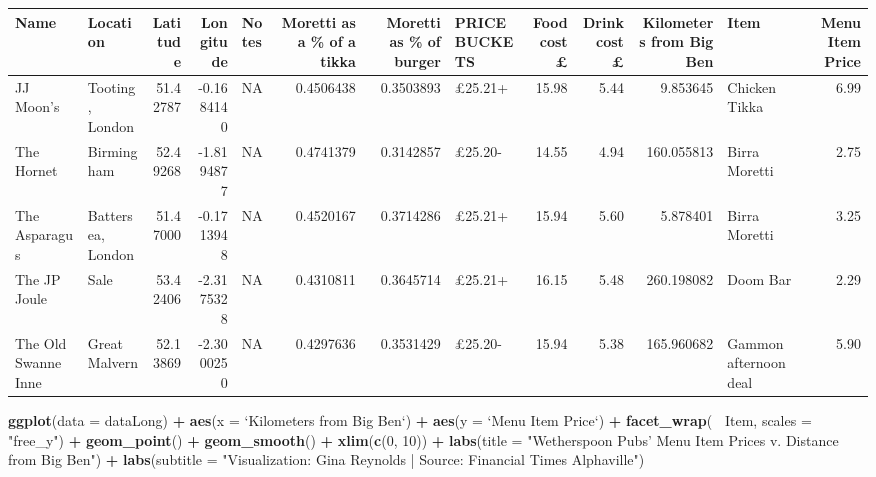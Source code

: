 \documentclass[]{book}
\newenvironment{Shaded}{\begin{snugshade}}{\end{snugshade}}
\newcommand{\KeywordTok}[1]{\textcolor[rgb]{0.13,0.29,0.53}{\textbf{#1}}}
\newcommand{\DataTypeTok}[1]{\textcolor[rgb]{0.13,0.29,0.53}{#1}}
\newcommand{\DecValTok}[1]{\textcolor[rgb]{0.00,0.00,0.81}{#1}}
\newcommand{\StringTok}[1]{\textcolor[rgb]{0.31,0.60,0.02}{#1}}
\newcommand{\OperatorTok}[1]{\textcolor[rgb]{0.81,0.36,0.00}{\textbf{#1}}}
\newcommand{\NormalTok}[1]{#1}
\theoremstyle{definition}
\theoremstyle{definition}
\theoremstyle{definition}
\theoremstyle{remark}
\begin{document}
\begin{tabular}{l|l|r|r|l|r|r|l|r|r|r|l|r}
\hline
Name & Location & Latitude & Longitude & Notes & Moretti as a \% of a tikka & Moretti as \% of burger & PRICE BUCKETS & Food cost £ & Drink cost £ & Kilometers from Big Ben & Item & Menu Item Price\\
\hline
JJ Moon's & Tooting, London & 51.42787 & -0.1684140 & NA & 0.4506438 & 0.3503893 & £25.21+ & 15.98 & 5.44 & 9.853645 & Chicken Tikka & 6.99\\
\hline
The Hornet & Birmingham & 52.49268 & -1.8194877 & NA & 0.4741379 & 0.3142857 & £25.20- & 14.55 & 4.94 & 160.055813 & Birra Moretti & 2.75\\
\hline
The Asparagus & Battersea, London & 51.47000 & -0.1713948 & NA & 0.4520167 & 0.3714286 & £25.21+ & 15.94 & 5.60 & 5.878401 & Birra Moretti & 3.25\\
\hline
The JP Joule & Sale & 53.42406 & -2.3175328 & NA & 0.4310811 & 0.3645714 & £25.21+ & 16.15 & 5.48 & 260.198082 & Doom Bar & 2.29\\
\hline
The Old Swanne Inne & Great Malvern & 52.13869 & -2.3000250 & NA & 0.4297636 & 0.3531429 & £25.20- & 15.94 & 5.38 & 165.960682 & Gammon afternoon deal & 5.90\\
\hline
\end{tabular}

\begin{Shaded}
\begin{Highlighting}[]
\KeywordTok{ggplot}\NormalTok{(}\DataTypeTok{data =}\NormalTok{ dataLong) }\OperatorTok{+}
\StringTok{  }\KeywordTok{aes}\NormalTok{(}\DataTypeTok{x =} \StringTok{`}\DataTypeTok{Kilometers from Big Ben}\StringTok{`}\NormalTok{) }\OperatorTok{+}
\StringTok{  }\KeywordTok{aes}\NormalTok{(}\DataTypeTok{y =} \StringTok{`}\DataTypeTok{Menu Item Price}\StringTok{`}\NormalTok{) }\OperatorTok{+}
\StringTok{  }\KeywordTok{facet_wrap}\NormalTok{(}\OperatorTok{~}\StringTok{ }\NormalTok{Item, }\DataTypeTok{scales =} \StringTok{"free_y"}\NormalTok{) }\OperatorTok{+}
\StringTok{  }\KeywordTok{geom_point}\NormalTok{() }\OperatorTok{+}
\StringTok{  }\KeywordTok{geom_smooth}\NormalTok{() }\OperatorTok{+}
\StringTok{  }\KeywordTok{xlim}\NormalTok{(}\KeywordTok{c}\NormalTok{(}\DecValTok{0}\NormalTok{, }\DecValTok{10}\NormalTok{)) }\OperatorTok{+}
\StringTok{  }\KeywordTok{labs}\NormalTok{(}\DataTypeTok{title =} \StringTok{"Wetherspoon Pubs' Menu Item Prices v. Distance from Big Ben"}\NormalTok{) }\OperatorTok{+}
\StringTok{  }\KeywordTok{labs}\NormalTok{(}\DataTypeTok{subtitle =} \StringTok{"Visualization: Gina Reynolds | Source: Financial Times Alphaville"}\NormalTok{) }
\end{Highlighting}
\end{Shaded}
\end{document}
